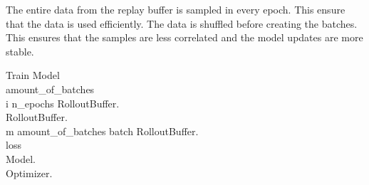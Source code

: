 The entire data from the replay buffer is sampled in every epoch. This ensure that the data is used efficiently. The data is shuffled before creating the batches. This ensures that the samples are less correlated and the model updates are more stable.




\renewcommand{\thepseudonum}{\roman{pseudonum}}
\begin{pseudocode}{Train Model}{ }
\\

amount\_of\_batches \GETS {}\\
\FOR i  \TO n\_epochs \DO
\BEGIN
RolloutBuffer.\\
RolloutBuffer.\\
\FOR m  \TO amount\_of\_batches \DO
\BEGIN
batch \GETS RolloutBuffer.\\
loss \GETS {}\\
Model.\\
Optimizer.\\
\END\\
\END
\ENDPROCEDURE

\end{pseudocode}



